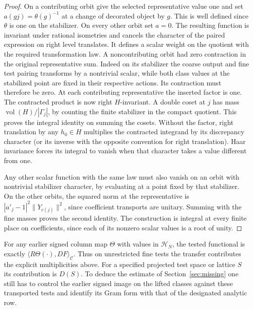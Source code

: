\documentclass[a4paper,11pt]{article}
\theoremstyle{definition}
\theoremstyle{remark}
\numberwithin{equation}{section}
\begin{document}
\begin{proof}
On a contributing orbit give the selected representative value
one and set \(a(gj)=\theta(g)^{-1}\) at a change of decorated
object by \(g\). This is well defined since \(\theta\) is one
on the stabilizer. On every other orbit set \(a=0\).
The resulting function is invariant under rational isometries
and cancels the character of the paired expression on right
level translates. It defines a scalar weight on the quotient
with the required transformation law. A noncontributing
orbit had zero contraction in the original representative
sum. Indeed on its stabilizer the coarse output and fine test
pairing transforms by a nontrivial scalar, while both class
values at the stabilized point are fixed in their respective
actions. Its contraction must therefore be zero. At each
contributing representative the inserted factor is one.
The contracted product is now right \(H\)-invariant. A
double coset at \(j\) has mass
\(\operatorname{vol}(H)/|\Gamma_j|\), by counting the
finite stabilizer in the compact quotient. This proves the
integral identity on summing the cosets.
Without the factor, right translation by any \(h_0\in H\)
multiplies the contracted integrand by its discrepancy
character (or its inverse with the opposite convention for
right translation). Haar invariance forces its integral to
vanish when that character takes a value different from one.

Any other scalar function with the same law must also vanish
on an orbit with nontrivial stabilizer character, by evaluating
at a point fixed by that stabilizer. On the other orbits, the
squared norm at the representative is
\(|a'_j-1|^2\|Y_{c(j)}\|^2\), since coefficient transports are
unitary. Summing with the fine masses proves the second identity.
The construction is integral at every finite place on coefficients,
since each of its nonzero scalar values is a root of unity.
\end{proof}

For any earlier signed column map \(\Theta\) with values in
\(\mathcal H_N\), the tested functional is exactly
\(\langle R\Theta(\cdot),DF\rangle_{\mathcal C}\).
Thus on unrestricted fine tests the transfer contributes the
explicit multiplicities above. For a specified projected test
space or lattice \(S\) its contribution is \(D(S)\).
To deduce the estimate of Section~\ref{sec:missing} one still
has to control the earlier signed image on the lifted classes
against these transported tests and identify its Gram form with
that of the designated analytic row.
\end{document}
